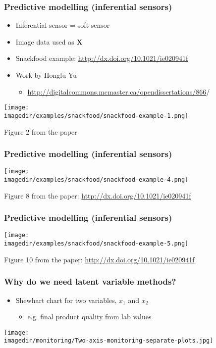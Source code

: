 \begin{frame}\frametitle{Predictive modelling (inferential sensors)}
	\begin{itemize}
		\item	Inferential sensor = soft sensor
		\item	Image data used as $\mathbf{X}$
		\item	Snackfood example: \href{http://dx.doi.org/10.1021/ie020941f}{http://dx.doi.org/10.1021/ie020941f}
		\item	Work by Honglu Yu
		\begin{itemize}
			\item	\href{http://digitalcommons.mcmaster.ca/opendissertations/866}{http://digitalcommons.mcmaster.ca/opendissertations/866}/
		\end{itemize}
	\end{itemize}

	\texttt{[image: \\imagedir/examples/snackfood/snackfood-example-1.png]}

	Figure 2 from the paper
\end{frame}

\begin{frame}\frametitle{Predictive modelling (inferential sensors)}

	\texttt{[image: \\imagedir/examples/snackfood/snackfood-example-4.png]}

	Figure 8 from the paper: \href{http://dx.doi.org/10.1021/ie020941f}{http://dx.doi.org/10.1021/ie020941f}
\end{frame}

\begin{frame}\frametitle{Predictive modelling (inferential sensors)}

	\texttt{[image: \\imagedir/examples/snackfood/snackfood-example-5.png]}

	Figure 10 from the paper: \href{http://dx.doi.org/10.1021/ie020941f}{http://dx.doi.org/10.1021/ie020941f}
\end{frame}

\begin{frame}\frametitle{Why do we need latent variable methods?}
	\begin{itemize}
		\item	Shewhart chart for two variables, $x_1$ and $x_2$
		\begin{itemize}
			\item	e.g. final product quality from lab values
		\end{itemize}
	\end{itemize}
	\texttt{[image: \\imagedir/monitoring/Two-axis-monitoring-separate-plots.jpg]}
\end{frame}

